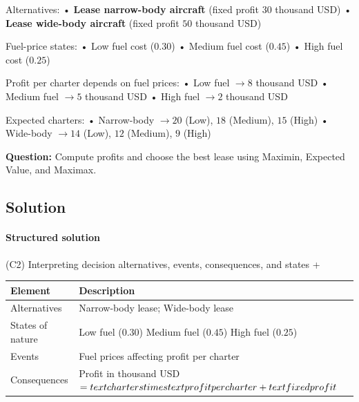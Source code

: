 \documentclass[11pt]{article}
\begin{document}
	
	Alternatives:
	• \textbf{Lease narrow-body aircraft} (fixed profit $30$ thousand USD)
	• \textbf{Lease wide-body aircraft} (fixed profit $50$ thousand USD)
	
	
	
	
	
	
	Fuel-price states:
	• Low fuel cost ($0.30$)
	• Medium fuel cost ($0.45$)
	• High fuel cost ($0.25$)
	
	
	
	
	
	
	Profit per charter depends on fuel prices:
	• Low fuel $\to 8$ thousand USD
	• Medium fuel $\to 5$ thousand USD
	• High fuel $\to 2$ thousand USD
	
	
	
	
	
	
	Expected charters:
	• Narrow-body $\to 20$ (Low), $18$ (Medium), $15$ (High)
	• Wide-body $\to 14$ (Low), $12$ (Medium), $9$ (High)
	
	
	
	
	
	\textbf{Question:} Compute profits and choose the best lease using Maximin, Expected Value, and Maximax.
	
	\subsection*{Solution}
	
	\hypertarget{problem10-solution}{}
	
	\paragraph{Structured solution}
	
	
	(C2) Interpreting decision alternatives, events, consequences, and states
	+
	
	
	\begin{center}
		\begin{tabular}{ll}
			\toprule
			Element & Description \\
			\midrule
			Alternatives & Narrow-body lease; Wide-body lease \\
			States of nature & Low fuel
			($0.30$)
			Medium fuel
			($0.45$)
			High fuel
			($0.25$) \\
			Events & Fuel prices affecting profit per charter \\
			Consequences & Profit in thousand USD $= \\text{charters} \\times \\text{profit per charter} + \\text{fixed profit}$ \\
			\bottomrule
		\end{tabular}
	\end{center}
	
\end{document}
